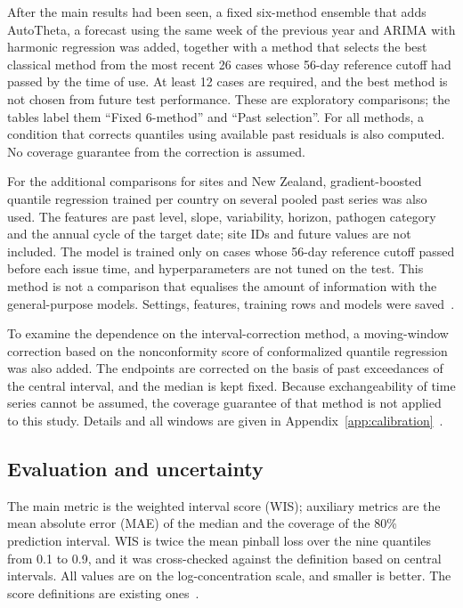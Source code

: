 \documentclass[11pt]{article}
\begin{document}
After the main results had been seen, a fixed six-method ensemble that adds AutoTheta, a forecast using the same week of the previous year and ARIMA with harmonic regression was added, together with a method that selects the best classical method from the most recent 26 cases whose 56-day reference cutoff had passed by the time of use. At least 12 cases are required, and the best method is not chosen from future test performance. These are exploratory comparisons; the tables label them ``Fixed 6-method'' and ``Past selection''. For all methods, a condition that corrects quantiles using available past residuals is also computed. No coverage guarantee from the correction is assumed.

For the additional comparisons for sites and New Zealand, gradient-boosted quantile regression trained per country on several pooled past series was also used. The features are past level, slope, variability, horizon, pathogen category and the annual cycle of the target date; site IDs and future values are not included. The model is trained only on cases whose 56-day reference cutoff passed before each issue time, and hyperparameters are not tuned on the test. This method is not a comparison that equalises the amount of information with the general-purpose models. Settings, features, training rows and models were saved~\cite{sklearnhgb}.

To examine the dependence on the interval-correction method, a moving-window correction based on the nonconformity score of conformalized quantile regression was also added. The endpoints are corrected on the basis of past exceedances of the central interval, and the median is kept fixed. Because exchangeability of time series cannot be assumed, the coverage guarantee of that method is not applied to this study. Details and all windows are given in Appendix~\ref{app:calibration}~\cite{romano2019}.

\subsection{Evaluation and uncertainty}

The main metric is the weighted interval score (WIS); auxiliary metrics are the mean absolute error (MAE) of the median and the coverage of the 80\% prediction interval. WIS is twice the mean pinball loss over the nine quantiles from 0.1 to 0.9, and it was cross-checked against the definition based on central intervals. All values are on the log-concentration scale, and smaller is better. The score definitions are existing ones~\cite{bracher2021,bracher2022}.
\end{document}

